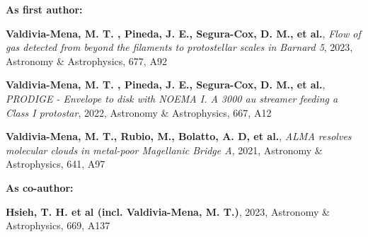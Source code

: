 \vspace{8pt}

\begin{cvparagraph}
\textbf{As first author:}
\vspace{4pt}
\begin{cvitems} %
	\item{\textbf{Valdivia-Mena, M. T. , Pineda, J. E., Segura-Cox, D. M., et al.}, \textit{Flow of gas detected from beyond the filaments to protostellar scales in Barnard 5}, 2023, Astronomy \& Astrophysics, 677, A92}
	\item{\textbf{Valdivia-Mena, M. T. , Pineda, J. E., Segura-Cox, D. M., et al.}, \textit{PRODIGE - Envelope to disk with NOEMA I. A 3000 au streamer feeding a Class I protostar}, 2022, Astronomy \& Astrophysics, 667, A12}
	\item{\textbf{Valdivia-Mena, M. T., Rubio, M., Bolatto, A. D, et al.}, \textit{ALMA resolves molecular clouds in metal-poor Magellanic Bridge A}, 2021, Astronomy \& Astrophysics, 641, A97}
\end{cvitems}
\vspace{8pt}
\textbf{As co-author:}
\vspace{4pt}
\begin{cvitems} %
	\item{{\textbf{Hsieh, T. H. et al (incl. Valdivia-Mena, M. T.)}, 2023, Astronomy \& Astrophysics, 669, A137}}
	
\end{cvitems}
\vspace{4pt}
\end{cvparagraph}


